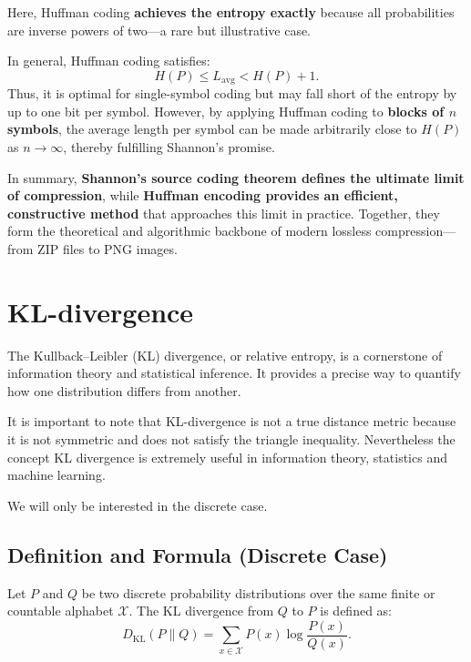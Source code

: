 \documentclass[11pt]{article}
\begin{document}
Here, Huffman coding \textbf{achieves the entropy exactly} because all probabilities are inverse powers of two—a rare but illustrative case.

In general, Huffman coding satisfies:
\[
H(P) \leq L_{\text{avg}} < H(P) + 1.
\]
Thus, it is optimal for single-symbol coding but may fall short of the entropy by up to one bit per symbol. However, by applying Huffman coding to \textbf{blocks of \(n\) symbols}, the average length per symbol can be made arbitrarily close to \(H(P)\) as \(n \to \infty\), thereby fulfilling Shannon’s promise.

In summary, \textbf{Shannon’s source coding theorem defines the ultimate limit of compression}, while \textbf{Huffman encoding provides an efficient, constructive method} that approaches this limit in practice. Together, they form the theoretical and algorithmic backbone of modern lossless compression—from ZIP files to PNG images.













\section{KL-divergence}








The Kullback--Leibler (KL) divergence, or relative entropy, is a cornerstone of information theory and statistical inference. It provides a precise way to quantify how one distribution differs from another. 

It is important to note that KL-divergence is not a true distance metric because it is not symmetric and does not satisfy the triangle inequality. Nevertheless the concept KL divergence is extremely useful in information theory, statistics and machine learning.

We will only be interested in the discrete case.

\subsection{Definition and Formula (Discrete Case)}

Let \( P \) and \( Q \) be two discrete probability distributions over the same finite or countable alphabet \( \mathcal{X} \). The KL divergence from \( Q \) to \( P \) is defined as:
\[
D_{\mathrm{KL}}(P \parallel Q) = \sum_{x \in \mathcal{X}} P(x) \log \frac{P(x)}{Q(x)}.
\]
\end{document}
